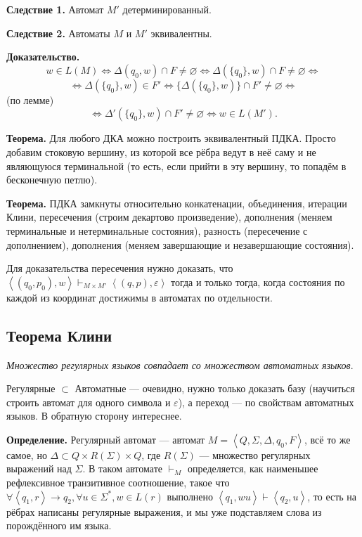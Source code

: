 \textbf{Следствие 1.} Автомат $M'$ детерминированный.

\textbf{Следствие 2.} Автоматы $M$ и $M'$ эквивалентны.

\textbf{Доказательство.}
\[
    w \in L(M) \iff \Delta(q_0, w) \cap F \ne \varnothing \iff \Delta(\{q_0\}, w) \cap F \ne \varnothing \iff
\]
\[
    \iff \Delta(\{q_0\}, w) \in F' \iff \{\Delta(\{q_0\}, w)\} \cap F' \ne \varnothing \iff
\]
(по лемме)
\[
    \iff \Delta'(\{q_0\}, w) \cap F' \ne \varnothing \iff w \in L(M').
\]

\QED

\textbf{Теорема.} Для любого ДКА можно построить эквивалентный ПДКА.
Просто добавим стоковую вершину, из которой все рёбра ведут в неё саму и не являющуюся терминальной (то есть, если прийти в эту вершину, то попадём в бесконечную петлю).

\textbf{Теорема.} ПДКА замкнуты относительно конкатенации, объединения, итерации Клини, пересечения (строим декартово произведение), дополнения (меняем терминальные и нетерминальные состояния), разность (пересечение с дополнением), дополнения (меняем завершающие и незавершающие состояния).

Для доказательства пересечения нужно доказать, что $\left< (q_0, p_0), w \right> \vdash_{M \times M'} \left< (q, p), \varepsilon \right>$ тогда и только тогда, когда состояния по каждой из координат достижимы в автоматах по отдельности.

\subsection{Теорема Клини}
\textit{Множество регулярных языков совпадает со множеством автоматных языков}.

Регулярные $\subset$ Автоматные --- очевидно, нужно только доказать базу (научиться строить автомат для одного символа и $\varepsilon$), а переход --- по свойствам автоматных языков.
В обратную сторону интереснее.

\textbf{Определение.} Регулярный автомат --- автомат $M = \left< Q, \Sigma, \Delta, q_0, F \right>$, всё то же самое, но $\Delta \subset Q \times R(\Sigma) \times Q$, где $R(\Sigma)$ --- множество регулярных выражений над $\Sigma$.
В таком автомате $\vdash_M$ определяется, как наименьшее рефлексивное транзитивное соотношение, такое что $\forall \left< q_1, r \right> \to q_2, \forall u \in \Sigma^*, w \in L(r)$ выполнено $\left< q_1, wu \right> \vdash \left< q_2, u \right>$, то есть на рёбрах написаны регулярные выражения, и мы уже подставляем слова из порождённого им языка.

